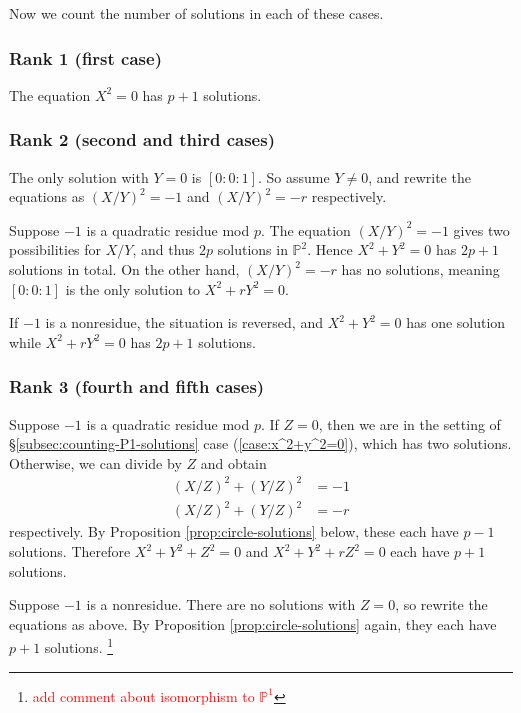 \documentclass[10pt,a4paper]{amsart}
\numberwithin{equation}{section}
\numberwithin{figure}{section}
\theoremstyle{definition}
\theoremstyle{remark}
\theoremstyle{plain}
\theoremstyle{plain}
\theoremstyle{definition}
\theoremstyle{plain}
\theoremstyle{plain}
\renewcommand{\P}{\mathbb{P}}
\begin{document}
    Now we count the number of solutions in each of these cases.

    \subsubsection*{Rank 1 (first case)} 
    The equation $X^2 = 0$ has $p + 1$ solutions.

    \subsubsection*{Rank 2 (second and third cases)} 
    The only solution with $Y=0$ is $[0:0:1]$. So assume $Y \neq 0$, and rewrite the 
    equations as $(X/Y)^2 = -1$ and $(X/Y)^2 = -r$ respectively.

    Suppose $-1$ is a quadratic residue mod $p$. The equation $(X/Y)^2 = -1$ gives
    two possibilities for $X/Y$, and thus $2p$ solutions in $\mathbb{P}^2$. Hence
    $X^2 + Y^2 = 0$ has $2p + 1$ solutions in total. On the other hand, $(X/Y)^2 =
    -r$ has no solutions, meaning $[0:0:1]$ is the only solution to $X^2 + rY^2 =
    0$.

    If $-1$ is a nonresidue, the situation is reversed, and $X^2 + Y^2 = 0$ has one
    solution while $X^2 + rY^2 = 0$ has $2p + 1$ solutions.

    \subsubsection*{Rank 3 (fourth and fifth cases)} 
    Suppose $-1$ is a quadratic residue mod $p$. If $Z = 0$, then we are in the setting of
    \S\ref{subsec:counting-P1-solutions} case (\ref{case:x^2+y^2=0}), which has two
    solutions. Otherwise, we can divide by $Z$ and obtain 
    \begin{align*} 
        (X/Z)^2 + (Y/Z)^2 &= -1 \\ 
        (X/Z)^2 + (Y/Z)^2 &= -r 
    \end{align*} 
    respectively. By Proposition \ref{prop:circle-solutions} below, these each have $p - 1$
    solutions. Therefore $X^2 + Y^2 + Z^2 = 0$ and $X^2 + Y^2 + rZ^2 = 0$ each have
    $p+1$ solutions.

    Suppose $-1$ is a nonresidue. There are no solutions with $Z=0$, so rewrite the
    equations as above. By Proposition \ref{prop:circle-solutions} again, they each
    have $p + 1$ solutions. \footnote{\textcolor{red}{add comment about isomorphism
    to $\P^1$}}
\end{document}
